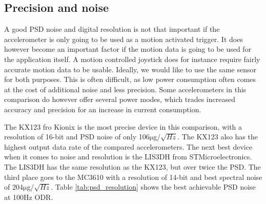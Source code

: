 
\subsection{Precision and noise}

A good PSD noise and digital resolution is not that important if the accelerometer is only going to be used as a motion activated trigger. It does however become an important factor if the motion data is going to be used for the application itself. A motion controlled joystick does for instance require fairly accurate motion data to be usable. Ideally, we would like to use the same sensor for both purposes. This is often difficult, as low power consumption often comes at the cost of additional noise and less precision. Some accelerometers in this comparison do however offer several power modes, which trades increased accuracy and precision for an increase in current consumption. 

The KX123 fro Kionix is the most precise device in this comparison, with a resolution of 16-bit and PSD noise of only 106$\si{\micro}$g/$\sqrt{Hz}$. The KX123 also has the highest output data rate of the compared accelerometers. The next best device when it comes to noise and resolution is the LIS3DH from STMicroelectronics. The LIS3DH has the same resolution as the KX123, but over twice the PSD. The third place goes to the MC3610 with a resolution of 14-bit and best spectral noise of 204$\si{\micro}$g/$\sqrt{Hz}$. Table \ref{tab:psd_resolution} shows the best achievable PSD noise at 100Hz ODR.  

